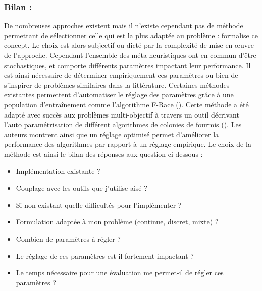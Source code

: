 \subsubsection{Bilan :} %
\label{ssub:bilan}
De nombreuses approches existent mais il n’existe cependant pas de méthode permettant de
sélectionner celle qui est la plus adaptée au problème : \cite{Wolpert199767} formalise
ce concept. Le choix est alors subjectif ou dicté par la complexité de mise en œuvre
de l’approche.
Cependant l’ensemble des méta-heuristiques ont en commun d’être stochastiques, et comporte
différents paramètres impactant leur performance.
Il est ainsi nécessaire de déterminer empiriquement ces paramètres ou bien de s’inspirer
de problèmes similaires dans la littérature.
Certaines méthodes existantes permettent d’automatiser le réglage des
paramètres grâce à une population d’entraînement comme l’algorithme F-Race (\cite{Birattari2010311}).
Cette méthode a été adapté avec succès aux problèmes multi-objectif à travers un outil
décrivant l’auto paramétrisation de différent algorithmes de colonies de fourmis (\cite{Lopez-Ibanez2012861}).
Les auteurs montrent ainsi que un réglage optimisé permet d’améliorer la performance
des algorithmes par rapport à un réglage empirique.
Le choix de la méthode est ainsi le bilan des réponses aux question ci-dessous :
\begin{itemize}
  \item Implémentation existante ?
  \item Couplage avec les outils que j’utilise aisé ?
  \item Si non existant quelle difficultés pour l’implémenter ?
  \item Formulation adaptée à mon problème (continue, discret, mixte) ?
  \item Combien de paramètres à régler ?
  \item Le réglage de ces paramètres est-il fortement impactant ?
  \item Le temps nécessaire pour une évaluation me permet-il de régler ces paramètres ?
\end{itemize}




